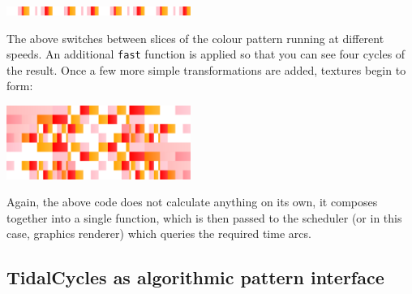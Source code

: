 \documentclass{nime-alternate} %
\newenvironment{Shaded}{\begin{snugshade}}{\end{snugshade}}
\newcommand{\DecValTok}[1]{\textcolor[rgb]{0.00,0.00,0.81}{#1}}
\newcommand{\FloatTok}[1]{\textcolor[rgb]{0.00,0.00,0.81}{#1}}
\newcommand{\NormalTok}[1]{#1}
\newcommand{\OperatorTok}[1]{\textcolor[rgb]{0.81,0.36,0.00}{\textbf{#1}}}
\newcommand{\StringTok}[1]{\textcolor[rgb]{0.31,0.60,0.02}{#1}}
\begin{document}
\begin{Shaded}
\end{Shaded}

\includegraphics[width=0.45\textwidth]{figures/43220a67b5b9a766c3b9b0b23e6fec64_gradient_0.pdf}

The above switches between slices of the colour pattern running at
different speeds. An additional \texttt{fast} function is applied so
that you can see four cycles of the result. Once a few more simple
transformations are added, textures begin to form:

\begin{Shaded}
\end{Shaded}

\includegraphics[width=0.45\textwidth]{figures/37d5734b7b2590f3dc2dcec00b8beaf5_gradient_0.pdf}

Again, the above code does not calculate anything on its own, it
composes together into a single function, which is then passed to the
scheduler (or in this case, graphics renderer) which queries the
required time arcs.

\hypertarget{tidalcycles-as-algorithmic-pattern-interface}{%
\subsection{TidalCycles as algorithmic pattern
interface}\label{tidalcycles-as-algorithmic-pattern-interface}}
\end{document}
